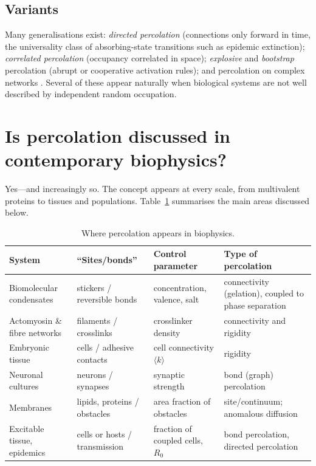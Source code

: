 \documentclass[11pt]{article}
\begin{document}
\subsection{Variants}

Many generalisations exist: \emph{directed percolation} (connections only forward in time, the universality class of absorbing-state transitions such as epidemic extinction); \emph{correlated percolation} (occupancy correlated in space); \emph{explosive} and \emph{bootstrap} percolation (abrupt or cooperative activation rules); and percolation on complex networks \cite{Callaway2000}. Several of these appear naturally when biological systems are not well described by independent random occupation.

\section{Is percolation discussed in contemporary biophysics?}\label{sec:bio}

Yes---and increasingly so. The concept appears at every scale, from multivalent proteins to tissues and populations. Table~\ref{tab:bio} summarises the main areas discussed below.

\begin{table}[t]
\centering
\small
\caption{Where percolation appears in biophysics.}
\label{tab:bio}
\begin{tabular}{p{3.1cm}p{3.4cm}p{3.2cm}p{3.6cm}}
\toprule
System & ``Sites/bonds'' & Control parameter & Type of percolation\\
\midrule
Biomolecular condensates & stickers / reversible bonds & concentration, valence, salt & connectivity (gelation), coupled to phase separation\\
Actomyosin \& fibre networks & filaments / crosslinks & crosslinker density & connectivity and rigidity\\
Embryonic tissue & cells / adhesive contacts & cell connectivity $\langle k\rangle$ & rigidity\\
Neuronal cultures & neurons / synapses & synaptic strength & bond (graph) percolation\\
Membranes & lipids, proteins / obstacles & area fraction of obstacles & site/continuum; anomalous diffusion\\
Excitable tissue, epidemics & cells or hosts / transmission & fraction of coupled cells, $R_0$ & bond percolation, directed percolation\\
\bottomrule
\end{tabular}
\end{table}
\end{document}
